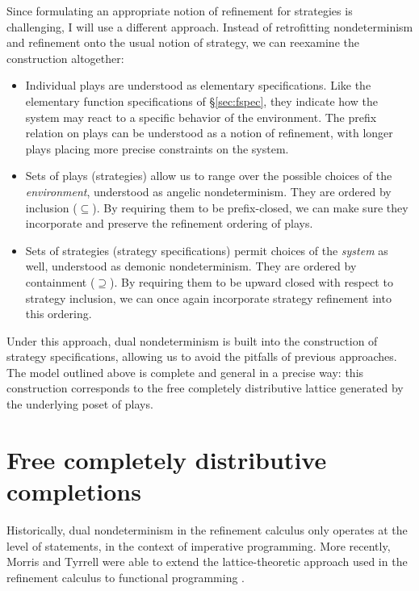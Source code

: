 \documentclass[11pt,oneside]{book}
\theoremstyle{definition}
\begin{document}
Since formulating an appropriate notion of refinement
for strategies is challenging,
I will use a different approach.
Instead of retrofitting nondeterminism and refinement
onto the usual notion of strategy,
we can reexamine the construction altogether:
\begin{itemize}
  \item Individual plays are understood as
    elementary specifications.
    Like the elementary function specifications of \S\ref{sec:fspec},
    they indicate how the system may react
    to a specific behavior of the environment.
    The prefix relation on plays
    can be understood as a notion of refinement,
    with longer plays placing more precise constraints
    on the system.
  \item Sets of plays (strategies)
    allow us to range over the possible choices of the \emph{environment},
    understood as angelic nondeterminism.
    They are ordered by inclusion ($\subseteq$).
    By requiring them to be prefix-closed,
    we can make sure they incorporate and preserve the refinement
    ordering of plays.
  \item Sets of strategies (strategy specifications)
    permit choices of the \emph{system} as well,
    understood as demonic nondeterminism.
    They are ordered by containment ($\supseteq$).
    By requiring them to be upward closed with respect to strategy inclusion,
    we can once again incorporate strategy refinement
    into this ordering.
\end{itemize}
Under this approach,
dual nondeterminism is built into
the construction of strategy specifications,
allowing us to avoid the pitfalls of previous approaches.
The model outlined above is complete and general
in a precise way:
this construction
corresponds to the free completely distributive lattice
generated by the underlying poset of plays.



\section{Free completely distributive completions} \label{sec:fcd} %

Historically,
dual nondeterminism in the refinement calculus
only operates at the level of statements,
in the context of imperative programming.
More recently,
Morris and Tyrrell were able to extend
the lattice-theoretic approach used in the refinement calculus
to functional programming
\citep{augtyp,dndf,cspdnd}.
\end{document}
